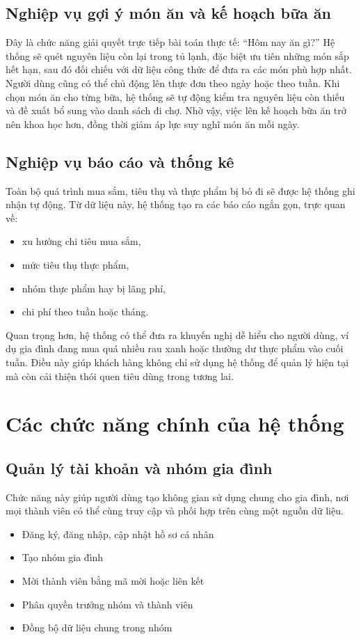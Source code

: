 \documentclass[12pt,a4paper]{report}
\begin{document}
\subsection{Nghiệp vụ gợi ý món ăn và kế hoạch bữa ăn}
Đây là chức năng giải quyết trực tiếp bài toán thực tế: “Hôm nay ăn gì?”  
Hệ thống sẽ quét nguyên liệu còn lại trong tủ lạnh, đặc biệt ưu tiên những món sắp hết hạn, sau đó đối chiếu với dữ liệu công thức để đưa ra các món phù hợp nhất.  
Người dùng cũng có thể chủ động lên thực đơn theo ngày hoặc theo tuần. Khi chọn món ăn cho từng bữa, hệ thống sẽ tự động kiểm tra nguyên liệu còn thiếu và đề xuất bổ sung vào danh sách đi chợ.  
Nhờ vậy, việc lên kế hoạch bữa ăn trở nên khoa học hơn, đồng thời giảm áp lực suy nghĩ món ăn mỗi ngày.  

\subsection{Nghiệp vụ báo cáo và thống kê}
Toàn bộ quá trình mua sắm, tiêu thụ và thực phẩm bị bỏ đi sẽ được hệ thống ghi nhận tự động.  
Từ dữ liệu này, hệ thống tạo ra các báo cáo ngắn gọn, trực quan về:  
\begin{itemize}
    \item xu hướng chi tiêu mua sắm,
    \item mức tiêu thụ thực phẩm,
    \item nhóm thực phẩm hay bị lãng phí,
    \item chi phí theo tuần hoặc tháng.
\end{itemize}
Quan trọng hơn, hệ thống có thể đưa ra khuyến nghị dễ hiểu cho người dùng, ví dụ gia đình đang mua quá nhiều rau xanh hoặc thường dư thực phẩm vào cuối tuần.  
Điều này giúp khách hàng không chỉ sử dụng hệ thống để quản lý hiện tại mà còn cải thiện thói quen tiêu dùng trong tương lai.

\section{Các chức năng chính của hệ thống}

\subsection{Quản lý tài khoản và nhóm gia đình}
Chức năng này giúp người dùng tạo không gian sử dụng chung cho gia đình, nơi mọi thành viên có thể cùng truy cập và phối hợp trên cùng một nguồn dữ liệu.  

\begin{itemize}
    \item Đăng ký, đăng nhập, cập nhật hồ sơ cá nhân 
    \item Tạo nhóm gia đình 
    \item Mời thành viên bằng mã mời hoặc liên kết 
    \item Phân quyền trưởng nhóm và thành viên 
    \item Đồng bộ dữ liệu chung trong nhóm 
\end{itemize}
\end{document}
